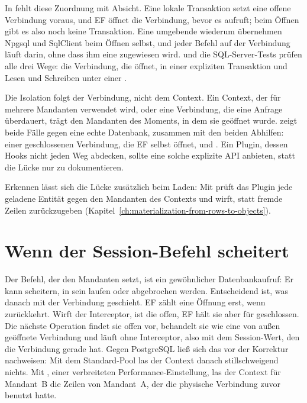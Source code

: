 In  fehlt diese Zuordnung mit Absicht. Eine lokale
Transaktion setzt eine offene Verbindung voraus, und EF öffnet die Verbindung, bevor es
 aufruft; beim Öffnen gibt es also noch keine Transaktion.
Eine umgebende  wiederum übernehmen Npgsql und SqlClient
beim Öffnen selbst, und jeder Befehl auf der Verbindung läuft darin, ohne dass ihm eine
 zugewiesen wird. 
und die SQL-Server-Tests prüfen alle drei Wege: die Verbindung, die
 öffnet,
 in einer expliziten Transaktion und
Lesen und Schreiben unter einer .

\begin{important}
  Die Isolation folgt der Verbindung, nicht dem Context. Ein Context, der für mehrere
  Mandanten verwendet wird, oder eine Verbindung, die eine Anfrage überdauert, trägt den
  Mandanten des Moments, in dem sie geöffnet wurde.
   zeigt beide Fälle gegen eine
  echte Datenbank, zusammen mit den beiden Abhilfen: einer geschlossenen Verbindung, die EF
  selbst öffnet, und . Ein
  Plugin, dessen Hooks nicht jeden Weg abdecken, sollte eine solche explizite API anbieten,
  statt die Lücke nur zu dokumentieren.
\end{important}

Erkennen lässt sich die Lücke zusätzlich beim Laden: Mit
 prüft das Plugin jede
geladene Entität gegen den Mandanten des Contexts und wirft, statt fremde Zeilen
zurückzugeben (Kapitel~\ref{ch:materialization-from-rows-to-objects}).

\section{Wenn der Session-Befehl scheitert}

Der Befehl, der den Mandanten setzt, ist ein gewöhnlicher Datenbankaufruf: Er kann scheitern,
in sein  laufen oder abgebrochen werden. Entscheidend ist,
was danach mit der Verbindung geschieht. EF zählt eine Öffnung erst, wenn
 zurückkehrt. Wirft der Interceptor, ist die
 offen, EF hält sie aber für geschlossen. Die nächste
Operation findet sie offen vor, behandelt sie wie eine von außen geöffnete Verbindung und
läuft ohne Interceptor, also mit dem Session-Wert, den die Verbindung gerade hat. Gegen
PostgreSQL ließ sich das vor der Korrektur nachweisen: Mit dem Standard-Pool las der Context
danach stillschweigend nichts. Mit , einer verbreiteten
Performance-Einstellung, las der Context für Mandant~B die Zeilen von Mandant~A, der die
physische Verbindung zuvor benutzt hatte.

